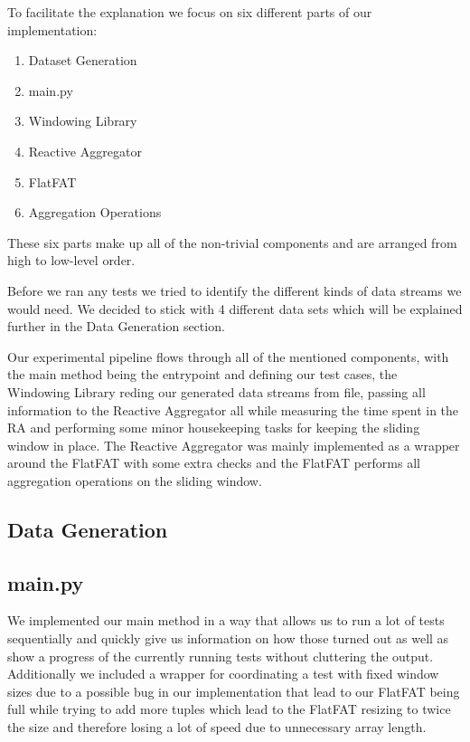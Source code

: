 To facilitate the explanation we focus on six different parts of our implementation:
\begin{enumerate}
  \item Dataset Generation
  \item main.py
  \item Windowing Library
  \item Reactive Aggregator
  \item FlatFAT
  \item Aggregation Operations
\end{enumerate}

These six parts make up all of the non-trivial components and are arranged from high
to low-level order.

Before we ran any tests we tried to identify the different kinds of data streams we
would need. We decided to stick with 4 different data sets which will be explained further
in the Data Generation section.

Our experimental pipeline flows through all of the mentioned components, with the main
method being the entrypoint and defining our test cases, the Windowing Library reding
our generated data streams from file, passing all information to the Reactive Aggregator
all while measuring the time spent in the RA and performing some minor housekeeping tasks
for keeping the sliding window in place.
The Reactive Aggregator was mainly implemented as a wrapper around the FlatFAT with some extra checks
and the FlatFAT performs all aggregation operations on the sliding window.

\subsection{Data Generation}
\label{sec:dg}




\subsection{main.py}
We implemented our main method in a way that allows us to run a lot of tests sequentially
and quickly give us information on how those turned out as well as show a progress of the
currently running tests without cluttering the output.
Additionally we included a wrapper for coordinating a test with fixed window sizes due
to a possible bug in our implementation that lead to our FlatFAT being full while trying
to add more tuples which lead to the FlatFAT resizing to twice the size and therefore
losing a lot of speed due to unnecessary array length.

